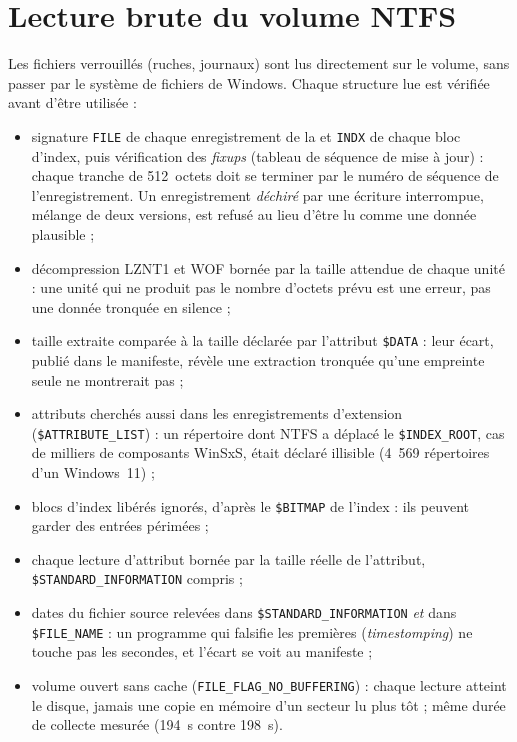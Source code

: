 \documentclass[11pt,a4paper,oneside]{report}
\begin{document}
\section{Lecture brute du volume NTFS}

Les fichiers verrouillés (ruches, journaux) sont lus directement sur le volume,
sans passer par le système de fichiers de Windows. Chaque structure lue est
vérifiée avant d'être utilisée :

\begin{itemize}
  \item signature \texttt{FILE} de chaque enregistrement de la 
    et \texttt{INDX} de chaque bloc d'index, puis vérification des
    \emph{fixups} (tableau de séquence de mise à jour) : chaque tranche de
    512~octets doit se terminer par le numéro de séquence de l'enregistrement.
    Un enregistrement \emph{déchiré} par une écriture interrompue, mélange de
    deux versions, est refusé au lieu d'être lu comme une donnée plausible ;
  \item décompression LZNT1 et WOF bornée par la taille attendue de chaque
    unité : une unité qui ne produit pas le nombre d'octets prévu est une
    erreur, pas une donnée tronquée en silence ;
  \item taille extraite comparée à la taille déclarée par l'attribut
    \texttt{\$DATA} : leur écart, publié dans le manifeste, révèle une
    extraction tronquée qu'une empreinte seule ne montrerait pas ;
  \item attributs cherchés aussi dans les enregistrements d'extension
    (\texttt{\$ATTRIBUTE\_LIST}) : un répertoire dont NTFS a déplacé le
    \texttt{\$INDEX\_ROOT}, cas de milliers de composants WinSxS, était
    déclaré illisible (4~569 répertoires d'un Windows~11) ;
  \item blocs d'index libérés ignorés, d'après le \texttt{\$BITMAP} de
    l'index : ils peuvent garder des entrées périmées ;
  \item chaque lecture d'attribut bornée par la taille réelle de l'attribut,
    \texttt{\$STANDARD\_INFORMATION} compris ;
  \item dates du fichier source relevées dans \texttt{\$STANDARD\_INFORMATION}
    \emph{et} dans \texttt{\$FILE\_NAME} : un programme qui falsifie les
    premières (\emph{timestomping}) ne touche pas les secondes, et l'écart se
    voit au manifeste ;
  \item volume ouvert sans cache (\texttt{FILE\_FLAG\_NO\_BUFFERING}) :
    chaque lecture atteint le disque, jamais une copie en mémoire d'un
    secteur lu plus tôt ; même durée de collecte mesurée (194~s contre
    198~s).
\end{itemize}
\end{document}

